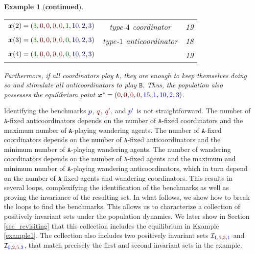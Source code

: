 \documentclass[10 pt,twocolumn,journal]{IEEEtran}
\theoremstyle{plain}
\newtheorem{example}{Example}[] %
\newcommand{\A}{\mathcal{A}}
\renewcommand{\O}{\mathcal{O}}
\newcommand{\I}{\mathcal{I}}
\newcommand{\X}{\mathcal{X}}
\newcommand{\x}{\bm{x}}
\newcommand{\p}{\tb{p}}
\newcommand{\pp}{\tb{p'}}
\newcommand{\q}{\tr{q}}
\newcommand{\qq}{\tr{q'}}
\renewcommand{\A}{\mathtt{A}}
\newcommand{\B}{\mathtt{B}}
\newcommand{\tb}{\textcolor{blue}}
\newcommand{\tr}{\textcolor{Myred}}
\theoremstyle{definition}
\begin{document}
\begin{example}[\textbf{continued}]
\begin{table}[ht]
\begin{center}
\begin{tabular}{|c|c|c|}
        $\x(2)=({\color{Mygreen}3}, {\color{Myred}0}, {\color{Myred}0}, {\color{Myred}0}, {\color{Myred}0}, {\color{Mygreen}1}, {\color{Myblue}10}, {\color{Myblue}2}, {\color{Myblue}3})$ &  type-$4$ coordinator & 19\\
        $\x(3)=({\color{Mygreen}3}, {\color{Myred}0}, {\color{Myred}0}, {\color{Myred}0}, {\color{Myred}0}, {\color{Mygreen}0}, {\color{Myblue}10}, {\color{Myblue}2}, {\color{Myblue}3})$ &  type-$1$ anticoordinator & 18\\ 
        \cellcolor{MyLightYellow}$\x(4)=({\color{Mygreen}4}, {\color{Myred}0}, {\color{Myred}0}, {\color{Myred}0}, {\color{Myred}0}, {\color{Mygreen}0}, {\color{Myblue}10}, {\color{Myblue}2}, {\color{Myblue}3})$ & & 19 \\
		\hline 
	\end{tabular} \label{tab:state2}
   \end{center}
\end{table}

Furthermore, if all coordinators play $\A$, they are enough to keep themselves doing so and stimulate all anticoordinators to play $\B$. 
Thus, the population also possesses the equilibrium point $\x^*=(\tr{0},\tr{0},\tr{0},\tr{0},\tb{15},\tb{1},\tb{10},\tb{2},\tb{3})$. 
\end{example}

Identifying the benchmarks $\p$, $\q$, $\qq$, and $\pp$ is not straightforward. 
The number of $\A$-fixed anticoordinators depends on the number of $\A$-fixed coordinators and the maximum number of $\A$-playing wandering agents.
The number of $\A$-fixed coordinators depends on the number of $\A$-fixed anticoordinators and the minimum number of $\A$-playing wandering agents.
The number of wandering coordinators depends on the number of $\A$-fixed agents and the maximum and minimum number of $\A$-playing wandering anticoordinators, 
which in turn depend on the number of $\A$-fixed agents and wandering coordinators.
This results in several loops, complexifying the identification of the benchmarks as well as proving the invariance of the resulting set.
In what follows, we show how to break the loops to find the benchmarks.
This allows us to characterize a collection of positively invariant sets under the population dynamics. 
We later show in Section \ref{sec_revisiting} that this collection includes the equilibrium in Example \ref{example1}.
The collection also includes two positively invariant sets $\I_{\tb{1}, \tr{5}, \tr{3}, \tb{1}}$ and $\I_{\tb{0}, \tr{2}, \tr{5}, \tb{3}}$, that match precisely the first and second invariant sets in the example.
\end{document}
